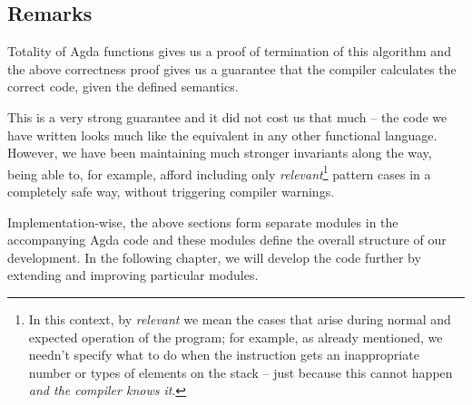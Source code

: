 \subsection{Remarks}

Totality of Agda functions gives us a proof of termination of this algorithm and
the above correctness proof gives us a guarantee that the compiler calculates
the correct code, given the defined semantics.

This is a very strong guarantee and it did not cost us that much -- the code we
have written looks much like the equivalent in any other functional language.
However, we have been maintaining much stronger invariants along the way, being
able to, for example, afford including only \emph{relevant}\footnote{In this
  context, by \emph{relevant} we mean the cases that arise during normal and
  expected operation of the program; for example, as already mentioned, we
needn't specify what to do when the instruction  gets an
inappropriate number or types of elements on the stack -- just because this
cannot happen \emph{and the compiler knows it}.} pattern cases in a completely
safe way, without triggering compiler warnings.

Implementation-wise, the above sections form separate modules in the
accompanying Agda code and these modules define the overall structure of our
development. In the following chapter, we will develop
the code further by extending and improving particular modules.


